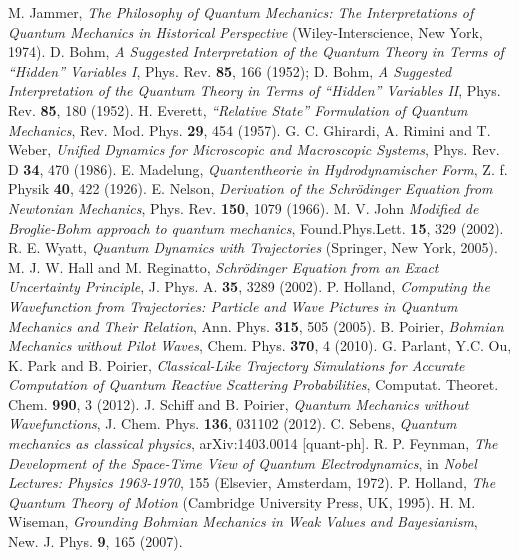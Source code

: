 \documentclass[twocolumn,aps,pra,amsmath,amssymb,superscriptaddress]{revtex4}
\renewcommand{\(}{\left(}
\renewcommand{\)}{\right)}
\begin{document}
{\begin{thebibliography}{99}

 M. Jammer, {\it The Philosophy of Quantum Mechanics: The Interpretations of Quantum Mechanics in Historical Perspective} (Wiley-Interscience, New York, 1974). 
 D. Bohm, {\it A Suggested Interpretation of the Quantum Theory in Terms of ``Hidden'' Variables I}, Phys. Rev. {\bf 85}, 166 (1952); D. Bohm, {\it A Suggested Interpretation of the Quantum Theory in Terms of ``Hidden'' Variables II}, Phys. Rev. {\bf 85}, 180 (1952).
 H. Everett, {\it ``Relative State'' Formulation of Quantum Mechanics}, Rev. Mod. Phys. {\bf 29}, 454 (1957).
 G. C. Ghirardi, A. Rimini and T. Weber, {\it Unified Dynamics for Microscopic and Macroscopic Systems}, Phys. Rev. D {\bf 34}, 470 (1986). 
 E. Madelung, {\it Quantentheorie in Hydrodynamischer Form}, Z. f. Physik {\bf 40}, 422 (1926).
 E. Nelson, {\it Derivation of the Schr\"odinger Equation from Newtonian Mechanics}, Phys. Rev. {\bf 150}, 1079 (1966).
 M. V. John {\it Modified de Broglie-Bohm
approach to quantum mechanics}, Found.Phys.Lett. {\bf 15}, 329 (2002).
  R. E. Wyatt, {\it Quantum Dynamics with Trajectories}
 (Springer, New York, 2005).
 M. J. W. Hall and M. Reginatto, {\it Schr\"odinger Equation from an Exact Uncertainty Principle}, J. Phys. A. {\bf 35}, 3289 (2002).
 P. Holland, {\it Computing the Wavefunction from
Trajectories: Particle and Wave Pictures
in Quantum Mechanics and Their Relation}, Ann. Phys. {\bf 315}, 505 (2005).
 B. Poirier, {\it Bohmian Mechanics without Pilot Waves},  Chem. Phys. {\bf 370}, 4 (2010).
 G. Parlant, Y.C. Ou, K. Park and B. Poirier, {\it Classical-Like Trajectory Simulations for Accurate Computation of Quantum Reactive Scattering Probabilities},
  Computat. Theoret. Chem. {\bf 990}, 3 (2012).
 J. Schiff and B. Poirier, {\it Quantum Mechanics without Wavefunctions}, J. Chem. Phys. {\bf 136}, 031102 (2012).
 C. Sebens, {\it Quantum mechanics as classical physics},  arXiv:1403.0014 [quant-ph].  
 R. P. Feynman, {\it The Development of the Space-Time View of
    Quantum Electrodynamics}, in {\it Nobel Lectures: Physics 1963-1970}, 155 (Elsevier, Amsterdam, 1972).  
 P. Holland, {\it The Quantum Theory of Motion} (Cambridge University Press, UK, 1995).
 H. M. Wiseman, {\it Grounding Bohmian Mechanics in Weak Values and Bayesianism}, New. J. Phys. {\bf 9}, 165 (2007).

\end{thebibliography}}
\end{document}
